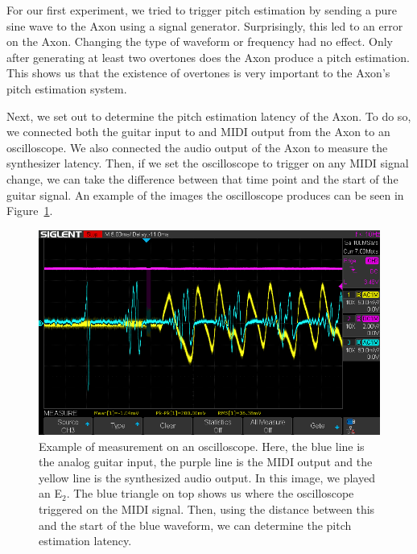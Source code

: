 \documentclass[a4paper,10pt,twocolumn]{article}
\newcommand{\note}[2]{#1${}_{#2}$}
\begin{document}
For our first experiment, we tried to trigger pitch estimation by sending a pure sine wave to the Axon using a signal generator. Surprisingly, this led to an error on the Axon. Changing the type of waveform or frequency had no effect. Only after generating at least two overtones does the Axon produce a pitch estimation. This shows us that the existence of overtones is very important to the Axon's pitch estimation system.

Next, we set out to determine the pitch estimation latency of the Axon. To do so, we connected both the guitar input to and MIDI output from the Axon to an oscilloscope. We also connected the audio output of the Axon to measure the synthesizer latency. %
Then, if we set the oscilloscope to trigger on any MIDI signal change, we can take the difference between that time point and the start of the guitar signal. An example of the images the oscilloscope produces can be seen in Figure~\ref{fig:osc_overview}.
\begin{figure}[h]
    \centering
    \includegraphics[width=\linewidth]{fig/osc_1.png}
    \caption{Example of measurement on an oscilloscope. Here, the blue line is the analog guitar input, the purple line is the MIDI output and the yellow line is the synthesized audio output. In this image, we played an \note{E}{2}. The blue triangle on top shows us where the oscilloscope triggered on the MIDI signal. Then, using the distance between this and the start of the blue waveform, we can determine the pitch estimation latency.}
    \label{fig:osc_overview}
\end{figure}
\end{document}
